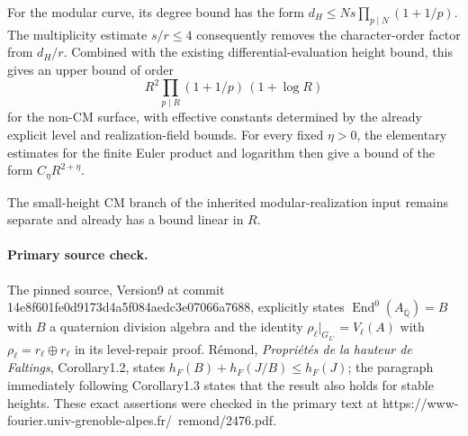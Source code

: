 For the modular curve, its degree bound has the form
$d_H\le Ns\prod_{p\mid N}(1+1/p)$. The multiplicity estimate
$s/r\le4$ consequently removes the character-order factor from
$d_H/r$. Combined with the existing differential-evaluation height
bound, this gives an upper bound of order
\[
 R^2\prod_{p\mid R}(1+1/p)\,(1+\log R)
\]
for the non-CM surface, with effective constants determined by the
already explicit level and realization-field bounds.
For every fixed $\eta>0$, the elementary estimates for the finite
Euler product and logarithm then give a bound of the form
$C_\eta R^{2+\eta}$.

The small-height CM branch of the inherited modular-realization
input remains separate and already has a bound linear in $R$.

\paragraph{Primary source check.}
The pinned source, Version9 at commit
14e8f601fe0d9173d4a5f084aedc3e07066a7688, explicitly states
$\operatorname{End}^0(A_{\overline{\mathbb Q}})=B$ with $B$ a
quaternion division algebra and the identity
$\rho_\ell|_{G_{L'}}=V_\ell(A)$ with
$\rho_\ell=r_\ell\oplus r_\ell$ in its level-repair proof.
Rémond, \emph{Propriétés de la hauteur de Faltings}, Corollary1.2,
states $h_F(B)+h_F(J/B)\le h_F(J)$; the paragraph immediately
following Corollary1.3 states that the result also holds for stable
heights. These exact assertions were checked in the primary text
at https://www-fourier.univ-grenoble-alpes.fr/~remond/2476.pdf.
